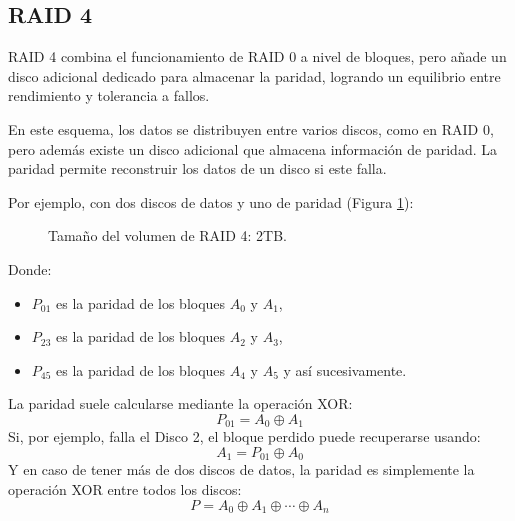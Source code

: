 \subsection{RAID 4}

RAID 4 combina el funcionamiento de RAID 0 a nivel de bloques, pero añade un disco adicional dedicado para almacenar la paridad, logrando un equilibrio entre rendimiento y tolerancia a fallos.

En este esquema, los datos se distribuyen entre varios discos, como en RAID 0, pero además existe un disco adicional que almacena información de paridad. La paridad permite reconstruir los datos de un disco si este falla.

Por ejemplo, con dos discos de datos y uno de paridad (Figura \ref{fig:raid4}):

\begin{figure}[!ht]
  \centering
  \caption{Tamaño del volumen de RAID 4: 2TB.}
  \label{fig:raid4}
\end{figure}
Donde:
\begin{itemize}
  \item \(P_{01}\) es la paridad de los bloques \(A_0\) y \(A_1\),
  \item \(P_{23}\) es la paridad de los bloques \(A_2\) y \(A_3\),
  \item \(P_{45}\) es la paridad de los bloques \(A_4\) y \(A_5\) y así sucesivamente.
\end{itemize}
La paridad suele calcularse mediante la operación XOR:
\[
  P_{01} = A_0 \oplus A_1
\]
Si, por ejemplo, falla el Disco 2, el bloque perdido puede recuperarse usando:
\[
  A_1 = P_{01} \oplus A_0
\]
Y en caso de tener más de dos discos de datos, la paridad es simplemente la operación XOR entre todos los discos:
\[
  P = A_0 \oplus A_1 \oplus \cdots \oplus A_n
\]


